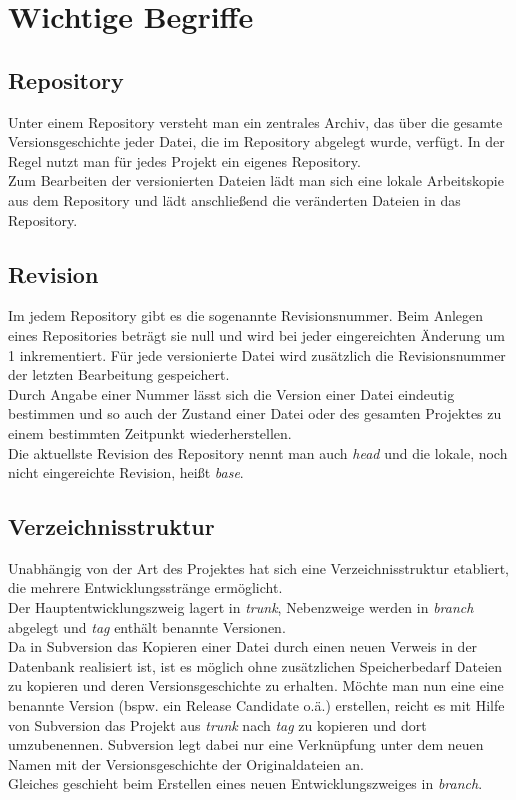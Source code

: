 \section{Wichtige Begriffe}
\subsection{Repository}
Unter einem Repository versteht man ein zentrales Archiv, das über die gesamte Versionsgeschichte jeder Datei, die im Repository abgelegt wurde, verfügt. In der Regel nutzt man für jedes Projekt ein eigenes Repository.\\
Zum Bearbeiten der versionierten Dateien lädt man sich eine lokale Arbeitskopie aus dem Repository und lädt anschließend die veränderten Dateien in das Repository.
\subsection{Revision}
Im jedem Repository gibt es die sogenannte Revisionsnummer. Beim Anlegen eines Repositories beträgt sie null und wird bei jeder eingereichten Änderung um 1 inkrementiert. Für jede versionierte Datei wird zusätzlich die Revisionsnummer der letzten Bearbeitung gespeichert.\\
Durch Angabe einer Nummer lässt sich die Version einer Datei eindeutig bestimmen und so auch der Zustand einer Datei oder des gesamten Projektes zu einem bestimmten Zeitpunkt wiederherstellen.\\
Die aktuellste Revision des Repository nennt man auch \emph{head} und die lokale, noch nicht eingereichte Revision, heißt \emph{base}.
\subsection{Verzeichnisstruktur}
Unabhängig von der Art des Projektes hat sich eine Verzeichnisstruktur etabliert, die mehrere Entwicklungsstränge ermöglicht.\\
Der Hauptentwicklungszweig lagert in \emph{trunk}, Nebenzweige werden in \emph{branch} abgelegt und \emph{tag} enthält benannte Versionen.\\
Da in Subversion das Kopieren einer Datei durch einen neuen Verweis in der Datenbank  realisiert ist, ist es möglich ohne zusätzlichen Speicherbedarf Dateien zu kopieren und deren Versionsgeschichte zu erhalten. Möchte man nun eine eine benannte Version (bspw. ein Release Candidate o.ä.) erstellen, reicht es mit Hilfe von Subversion das Projekt aus \emph{trunk} nach \emph{tag} zu kopieren und dort umzubenennen. Subversion legt dabei nur eine Verknüpfung unter dem neuen Namen mit der Versionsgeschichte der Originaldateien an.\\
Gleiches geschieht beim Erstellen eines neuen Entwicklungszweiges in \emph{branch}.
